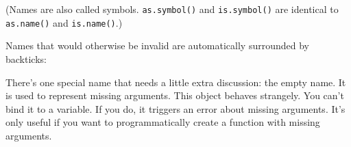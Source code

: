 \begin{Shaded}
\begin{Highlighting}[]
\NormalTok{(}\NormalTok{)}
\NormalTok{(}\NormalTok{(}\NormalTok{))}

\NormalTok{(}\NormalTok{)}
\NormalTok{(}
\NormalTok{(}\NormalTok{(}
\end{Highlighting}
\end{Shaded}

(Names are also called symbols. \texttt{as.symbol()} and
\texttt{is.symbol()} are identical to \texttt{as.name()} and
\texttt{is.name()}.)

Names that would otherwise be invalid are automatically surrounded by
backticks: 

\begin{Shaded}
\begin{Highlighting}[]
\NormalTok{(}\NormalTok{)}
\NormalTok{(}\NormalTok{)}
\end{Highlighting}
\end{Shaded}

There's one special name that needs a little extra discussion: the empty
name. It is used to represent missing arguments. This object behaves
strangely. You can't bind it to a variable. If you do, it triggers an
error about missing arguments. It's only useful if you want to
programmatically create a function with missing arguments.

\begin{Shaded}
\begin{Highlighting}[]
\StringTok{ }
\NormalTok{(}
\NormalTok{(}

\StringTok{ }
\end{Highlighting}
\end{Shaded}

